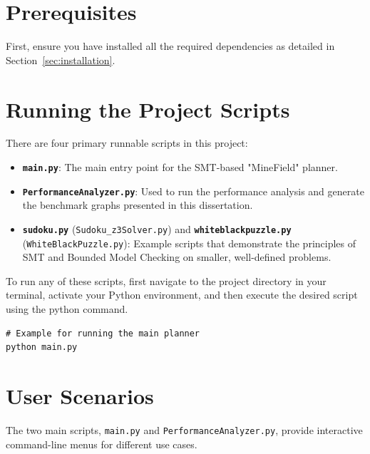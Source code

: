 \documentclass[12pt, a4paper, oneside]{report} %
\begin{document}
\section{Prerequisites}

First, ensure you have installed all the required dependencies as detailed in Section~\ref{sec:installation}.
\section{Running the Project Scripts}

There are four primary runnable scripts in this project:
\begin{itemize}
    \item \textbf{\texttt{main.py}}: The main entry point for the SMT-based "MineField" planner.
    \item \textbf{\texttt{PerformanceAnalyzer.py}}: Used to run the performance analysis and generate the benchmark graphs presented in this dissertation.
    \item \textbf{\texttt{sudoku.py}} (\texttt{Sudoku\_z3Solver.py}) and \textbf{\texttt{whiteblackpuzzle.py}} (\texttt{WhiteBlackPuzzle.py}): Example scripts that demonstrate the principles of SMT and Bounded Model Checking on smaller, well-defined problems.
\end{itemize}

To run any of these scripts, first navigate to the project directory in your terminal, activate your Python environment, and then execute the desired script using the python command.
\begin{verbatim}
# Example for running the main planner
python main.py
\end{verbatim}

\section{User Scenarios}

The two main scripts, \texttt{main.py} and \texttt{PerformanceAnalyzer.py}, provide interactive command-line menus for different use cases.
\end{document}
